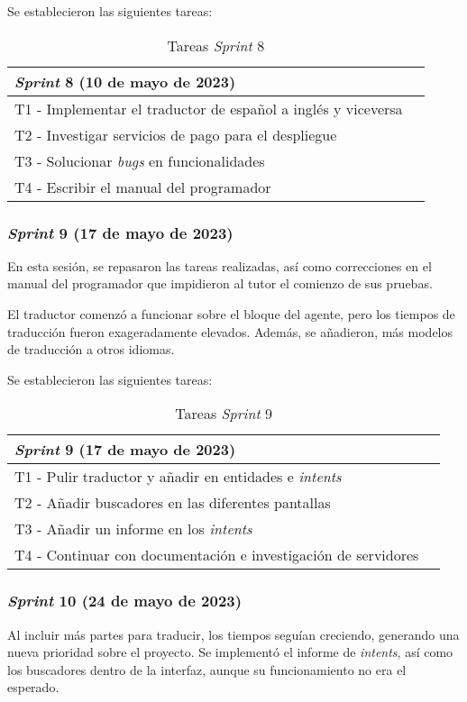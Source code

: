Se establecieron las siguientes tareas:
\begin{table}[H]
\centering
\begin{tabular}{ll}
\toprule
\textit{Sprint} 8 (10 de mayo de 2023)   \\
\midrule
T1 - Implementar el traductor de español a inglés y viceversa\\
T2 - Investigar servicios de pago para el despliegue\\
T3 - Solucionar \textit{bugs} en funcionalidades\\
T4 - Escribir el manual del programador\\
\bottomrule
\end{tabular}
\caption{Tareas \textit{Sprint} 8}
\end{table}

\subsubsection{\textit{Sprint} 9 (17 de mayo de 2023)}
En esta sesión, se repasaron las tareas realizadas, así como correcciones en el manual del programador que impidieron al tutor el comienzo de sus pruebas.

El traductor comenzó a funcionar sobre el bloque del agente, pero los tiempos de traducción fueron exageradamente elevados. Además, se añadieron, más modelos de traducción a otros idiomas.

Se establecieron las siguientes tareas:
\begin{table}[H]
\centering
\begin{tabular}{ll}
\toprule
\textit{Sprint} 9 (17 de mayo de 2023)   \\
\midrule
T1 - Pulir traductor y añadir en entidades e \textit{intents}\\
T2 - Añadir buscadores en las diferentes pantallas\\
T3 - Añadir un informe en los \textit{intents}\\
T4 - Continuar con documentación e investigación de servidores\\
\bottomrule
\end{tabular}
\caption{Tareas \textit{Sprint} 9}
\end{table}

\subsubsection{\textit{Sprint} 10 (24 de mayo de 2023)}
Al incluir más partes para traducir, los tiempos seguían creciendo, generando una nueva prioridad sobre el proyecto. Se implementó el informe de \textit{intents}, así como los buscadores dentro de la interfaz, aunque su funcionamiento no era el esperado. 

